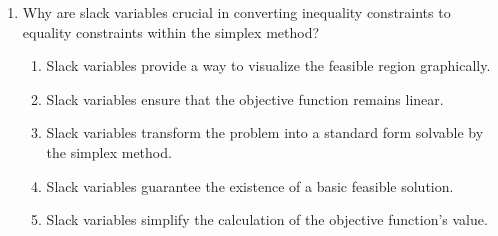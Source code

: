 \documentclass{article}%
\begin{document}
\begin{enumerate}
\begin{enumerate}
\begin{enumerate}
\end{enumerate}%
\vspace{0.5em}%
\item What is the value of the objective function $Z$ at the IBFS?%
\begin{enumerate}%
\item 12%
\item 0%
\item 7%
\item 5%
\item 25%
\end{enumerate}%
\vspace{0.5em}%
\item Which variable would enter the basis in the first iteration of the simplex method?%
\begin{enumerate}%
\item $s_1$%
\item $s_2$%
\item $x_1$%
\item $x_2$%
\item None, the solution is optimal.%
\end{enumerate}%
\vspace{0.5em}%
\item What is the maximum value of $x_2$ allowed by the constraints, given that $x_1 = 0$?%
\begin{enumerate}%
\item 7%
\item 5%
\item 2%
\item 0%
\item 12%
\end{enumerate}%
\vspace{0.5em}%
\end{enumerate}%
\item Why are slack variables crucial in converting inequality constraints to equality constraints within the simplex method?%
\begin{enumerate}%
\item Slack variables provide a way to visualize the feasible region graphically.%
\item Slack variables ensure that the objective function remains linear.%
\item Slack variables transform the problem into a standard form solvable by the simplex method.%
\item Slack variables guarantee the existence of a basic feasible solution.%
\item Slack variables simplify the calculation of the objective function's value.%

\end{enumerate}
\end{enumerate}
\end{document}
